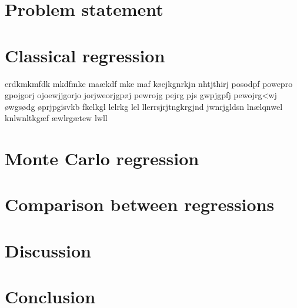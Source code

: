 \documentclass{article}
\begin{document}
	\section{Problem statement}
	\newpage
	\section{Classical regression}
 	erdkmkmfdk mkdfmke maækdf mke maf  køejkgnrkjn nhtjthirj posodpf powepro gpojgorj ojoewjjgorjo jorjweorjgpøj pewrojg pejrg pjs gwpjgpfj pewojrg<wj  øwgsødg øprjpgisvkb fkelkgl lelrkg lel   llerrsjrjtngkrgjnd jwnrjgldsn  lnælqnwel knlwnltkgæf æwlrgætew lwll
	\newpage
	\section{Monte Carlo regression}
	\newpage
	\section{Comparison between regressions}
	\newpage
	\section{Discussion}
	\newpage
	\section{Conclusion}
	\newpage
 	\Litterature
  
\end{document}
